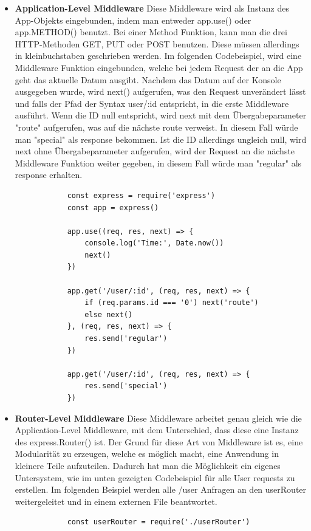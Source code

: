 \begin{itemize}
    \item \textbf{Application-Level Middleware}
        \newline
        Diese Middleware wird als Instanz des App-Objekts eingebunden, indem man entweder app.use() oder app.METHOD() benutzt. Bei einer Method Funktion, kann man die drei HTTP-Methoden GET, PUT oder POST benutzen. Diese müssen allerdings in kleinbuchstaben geschrieben werden.
        \newline
        Im folgenden Codebeispiel, wird eine Middleware Funktion eingebunden, welche bei jedem Request der an die App geht das aktuelle Datum ausgibt. Nachdem das Datum auf der Konsole ausgegeben wurde, wird next() aufgerufen, was den Request unverändert lässt und falls der Pfad der Syntax user/:id entspricht, in die erste Middleware ausführt. Wenn die ID null entspricht, wird next mit dem Übergabeparameter "route" aufgerufen, was auf die nächste route verweist. In diesem Fall würde man "special" als response bekommen. Ist die ID allerdings ungleich null, wird next ohne Übergabeparameter aufgerufen, wird der Request an die nächste Middleware Funktion weiter gegeben, in diesem Fall würde man "regular" als response erhalten.
        \begin{lstlisting}
            const express = require('express')
            const app = express()

            app.use((req, res, next) => {
                console.log('Time:', Date.now())
                next()
            })
    
            app.get('/user/:id', (req, res, next) => {
                if (req.params.id === '0') next('route')
                else next()
            }, (req, res, next) => {
                res.send('regular')
            })

            app.get('/user/:id', (req, res, next) => {
                res.send('special')
            })
        \end{lstlisting}
    \item \textbf{Router-Level Middleware}
        \newline
        Diese Middleware arbeitet genau gleich wie die Application-Level Middleware, mit dem Unterschied, dass diese eine Instanz des express.Router() ist. Der Grund für diese Art von Middleware ist es, eine Modularität zu erzeugen, welche es möglich macht, eine Anwendung in kleinere Teile aufzuteilen. Dadurch hat man die Möglichkeit ein eigenes Untersystem, wie im unten gezeigten Codebeispiel für alle User requests zu erstellen. Im folgenden Beispiel werden alle /user Anfragen an den userRouter weitergeleitet und in einem externen File beantwortet.
        \begin{lstlisting}
            const userRouter = require('./userRouter')
            

\end{lstlisting}
\end{itemize}

